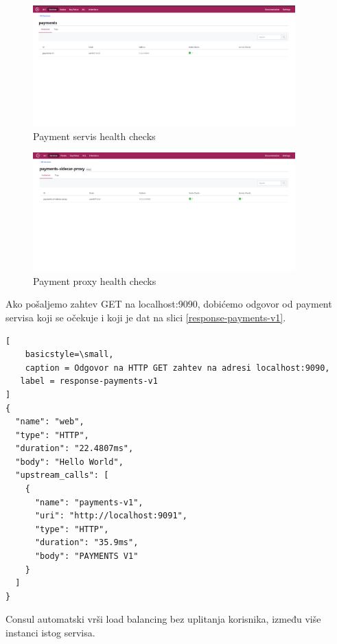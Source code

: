 \documentclass[a4paper,12pt]{report}
\begin{document}
\begin{figure}[h]
    \centering
    \includegraphics[width=0.9\textwidth]{service_health_check}
    \caption{Payment servis health checks}
    \label{fig:service-health-check}
\end{figure} 

\begin{figure}[h]
    \centering
    \includegraphics[width=0.9\textwidth]{proxy_health_check}
    \caption{Payment proxy health checks}
    \label{fig:proxy-health-check}
\end{figure}

Ako pošaljemo zahtev GET na localhost:9090, dobićemo odgovor od payment servisa koji se očekuje i koji je dat na slici \ref{response-payments-v1}. \newline

\begin{lstlisting}[
    basicstyle=\small,
    caption = Odgovor na HTTP GET zahtev na adresi localhost:9090, 
   label = response-payments-v1
]
{
  "name": "web",
  "type": "HTTP",
  "duration": "22.4807ms",
  "body": "Hello World",
  "upstream_calls": [
    {
      "name": "payments-v1",
      "uri": "http://localhost:9091",
      "type": "HTTP",
      "duration": "35.9ms",
      "body": "PAYMENTS V1"
    }
  ]
}
\end{lstlisting}

Consul automatski vrši load balancing bez uplitanja korisnika, između više instanci istog servisa. \newline
\end{document}
